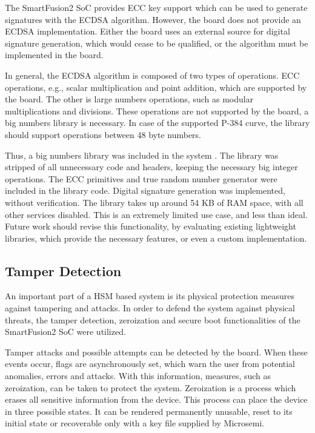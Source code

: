 The SmartFusion2 SoC provides ECC key support which can be used to generate signatures with the ECDSA algorithm. However, the board does not provide an ECDSA implementation. Either the board uses an external source for digital signature generation, which would cease to be qualified, or the algorithm must be implemented in the board.

In general, the ECDSA algorithm is composed of two types of operations. ECC operations, e.g., scalar multiplication and point addition, which are supported by the board. The other is large numbers operations, such as modular multiplications and divisions. These operations are not supported by the board, a big numbers library is necessary. In case of the supported P-384 curve, the library should support operations between 48 byte numbers. 

Thus, a big numbers library was included in the system \cite{libecc}. The library was stripped of all unnecessary code and headers, keeping the necessary big integer operations. The ECC primitives and true random number generator were included in the library code. Digital signature generation was implemented, without verification. The library takes up around 54 KB of RAM space, with all other services disabled.
This is an extremely limited use case, and less than ideal. Future work should revise this functionality, by evaluating existing lightweight libraries, which provide the necessary features, or even a custom implementation.

\subsection{Tamper Detection}\label{chap:implementation:services:tamper-detection}

An important part of a HSM based system is its physical protection measures against tampering and attacks.
In order to defend the system against physical threats, the tamper detection, zeroization and secure boot functionalities of the SmartFusion2 SoC were utilized.

Tamper attacks and possible attempts can be detected by the board. When these events occur, flags are asynchronously set, which warn the user from potential anomalies, errors and attacks. With this information, measures, such as zeroization, can be taken to protect the system.
Zeroization is a process which erases all sensitive information from the device. This process can place the device in three possible states. It can be rendered permanently unusable, reset to its initial state or recoverable only with a key file supplied by Microsemi.

